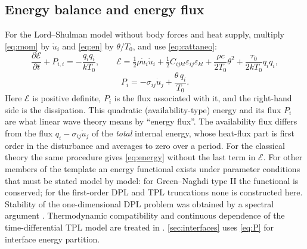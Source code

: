 \subsection{Energy balance and energy flux}\label{sec:energy}
For the Lord--Shulman model without body forces and heat supply, multiply \eqref{eq:mom} by $\dot u_i$ and \eqref{eq:en} by $\theta/T_0$, and use \eqref{eq:cattaneo}:
\begin{equation}
\frac{\partial\mathcal E}{\partial t}+P_{i,i}=-\frac{q_iq_i}{kT_0},\qquad
\mathcal E=\tfrac12\rho\dot u_i\dot u_i+\tfrac12C_{ijkl}\varepsilon_{ij}\varepsilon_{kl}+\frac{\rho c}{2T_0}\theta^2+\frac{\tau_0}{2kT_0}q_iq_i,\label{eq:energy}
\end{equation}
\begin{equation}
P_i=-\sigma_{ij}\dot u_j+\frac{\theta\,q_i}{T_0}.\label{eq:P}
\end{equation}
Here $\mathcal E$ is positive definite, $P_i$ is the flux associated with it, and the right-hand side is the dissipation. This quadratic (availability-type) energy and its flux $P_i$ are what linear wave theory means by ``energy flux''. The availability flux differs from the flux $q_i-\sigma_{ij}\dot u_j$ of the \emph{total} internal energy, whose heat-flux part is first order in the disturbance and averages to zero over a period. For the classical theory the same procedure gives \eqref{eq:energy} without the last term in $\mathcal E$. For other members of the template an energy functional exists under parameter conditions that must be stated model by model: for Green--Naghdi type II the functional is conserved; for the first-order DPL and TPL truncations none is constructed here. Stability of the one-dimensional DPL problem was obtained by a spectral argument \citep{Quintanilla2003DPL}. Thermodynamic compatibility and continuous dependence of the time-differential TPL model are treated in \citep{Chirita2016}. \cref{sec:interfaces} uses \eqref{eq:P} for interface energy partition.

